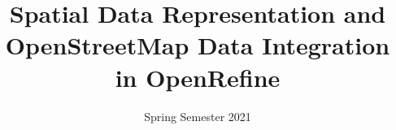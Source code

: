 \title  {Spatial Data Representation and OpenStreetMap Data Integration in OpenRefine}
\addresses  {\groupname\\\deptname\\\univname} 
\date       {Spring Semester 2021}

\maketitle